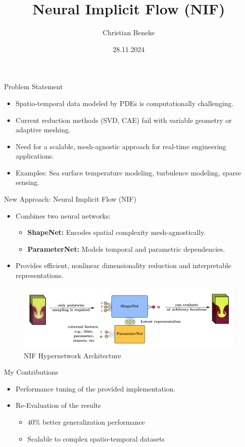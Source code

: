 \documentclass{beamer}
\title{Neural Implicit Flow (NIF)}
\author{Christian Beneke}
\date{28.11.2024}
\begin{document}
\frame{\titlepage}

\begin{frame}{Problem Statement}
\begin{itemize}
    \item Spatio-temporal data modeled by PDEs is computationally challenging.
    \item Current reduction methods (SVD, CAE) fail with variable geometry or adaptive meshing.
    \item Need for a scalable, mesh-agnostic approach for real-time engineering applications.
    \item Examples: Sea surface temperature modeling, turbulence modeling, sparse sensing.
\end{itemize}
\end{frame}

\begin{frame}{New Approach: Neural Implicit Flow (NIF)}
\begin{itemize}
    \item Combines two neural networks:
    \begin{itemize}
        \item \textbf{ShapeNet:} Encodes spatial complexity mesh-agnostically.
        \item \textbf{ParameterNet:} Models temporal and parametric dependencies.
    \end{itemize}
    \item Provides efficient, nonlinear dimensionality reduction and interpretable representations.
\end{itemize}
\begin{figure}
    \includegraphics[width=0.6\linewidth]{hypernetwork_diagram.png}
    \caption{NIF Hypernetwork Architecture}
\end{figure}
\end{frame}

\begin{frame}{My Contributions}
\begin{itemize}
    \item Performance tuning of the provided implementation.
    \item Re-Evaluation of the results
    \begin{itemize}
        \item 40\% better generalization performance
        \item Scalable to complex spatio-temporal datasets
    \end{itemize}
\end{itemize}
\end{frame}
\end{document}
